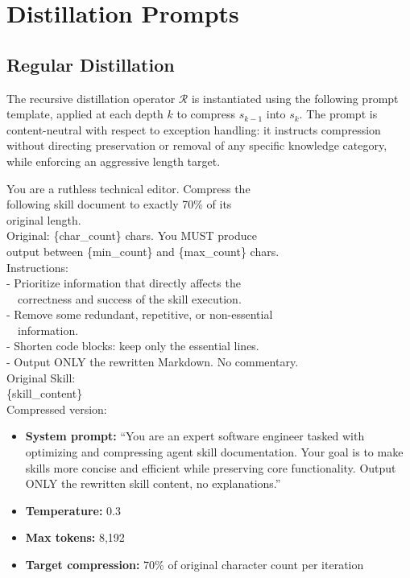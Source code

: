 \documentclass[11pt]{article}
\begin{document}
\section{Distillation Prompts}
\label{sec:distill-prompt}

\subsection{Regular Distillation}

The recursive distillation operator $\mathcal{R}$ is instantiated using the following prompt template, applied at each depth $k$ to compress $s_{k-1}$ into $s_k$. The prompt is content-neutral with respect to exception handling: it instructs compression without directing preservation or removal of any specific knowledge category, while enforcing an aggressive length target.

\begin{promptblock}
\small\ttfamily
You are a ruthless technical editor. Compress the\\
following skill document to exactly 70\% of its\\
original length.\\[2pt]
Original: \{char\_count\} chars. You MUST produce\\
output between \{min\_count\} and \{max\_count\} chars.\\[2pt]
Instructions:\\
- Prioritize information that directly affects the\\
~~correctness and success of the skill execution.\\
- Remove some redundant, repetitive, or non-essential\\
~~information.\\
- Shorten code blocks: keep only the essential lines.\\
- Output ONLY the rewritten Markdown. No commentary.\\[2pt]
Original Skill:\\[2pt]
\{skill\_content\}\\[2pt]
Compressed version:
\end{promptblock}

\begin{settingsblock}
\begin{itemize}
\item \textbf{System prompt:} ``You are an expert software engineer tasked with optimizing and compressing agent skill documentation. Your goal is to make skills more concise and efficient while preserving core functionality. Output ONLY the rewritten skill content, no explanations.''
\item \textbf{Temperature:} 0.3
\item \textbf{Max tokens:} 8,192
\item \textbf{Target compression:} 70\% of original character count per iteration
\end{itemize}
\end{settingsblock}
\end{document}
